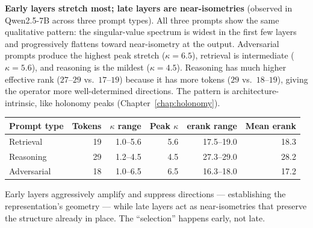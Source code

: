 \documentclass[11pt, twoside, openright]{memoir}
\numberwithin{equation}{chapter}
\begin{document}
\begin{finding}
\textbf{Early layers stretch most; late layers are near-isometries}
(observed in Qwen2.5-7B across three prompt types).
All three prompts show the same qualitative pattern: the singular-value
spectrum is widest in the first few layers and progressively flattens
toward near-isometry at the output.  Adversarial prompts produce the
highest peak stretch ($\kappa = 6.5$), retrieval is intermediate
($\kappa = 5.6$), and reasoning is the mildest ($\kappa = 4.5$).
Reasoning has much higher effective rank ($27$--$29$ vs.\ $17$--$19$)
because it has more tokens ($29$ vs.\ $18$--$19$), giving the operator
more well-determined directions.  The pattern is architecture-intrinsic,
like holonomy peaks (Chapter~\ref{chap:holonomy}).

\smallskip
\begin{center}
\renewcommand{\arraystretch}{1.2}\small
\begin{tabular}{@{} l r r r r r @{}}
\toprule
\textbf{Prompt type} & \textbf{Tokens} & \textbf{$\kappa$ range} &
  \textbf{Peak $\kappa$} & \textbf{erank range} & \textbf{Mean erank} \\
\midrule
Retrieval   & 19 & 1.0--5.6 & 5.6 & 17.5--19.0 & 18.3 \\
Reasoning   & 29 & 1.2--4.5 & 4.5 & 27.3--29.0 & 28.2 \\
Adversarial & 18 & 1.0--6.5 & 6.5 & 16.3--18.0 & 17.2 \\
\bottomrule
\end{tabular}
\end{center}
\smallskip

Early layers aggressively amplify and suppress directions ---
establishing the representation's geometry --- while late layers act
as near-isometries that preserve the structure already in place.
The ``selection'' happens early, not late.
\end{finding}
\end{document}
